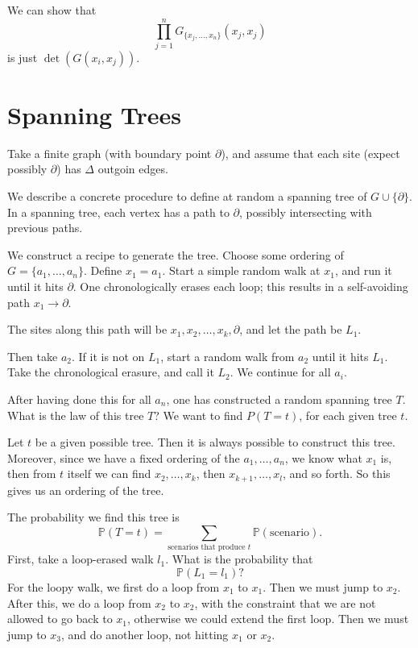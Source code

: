 \documentclass[12pt]{article}
\begin{document}
\begin{remark}
	We can show that
	\[
		\prod_{j = 1}^{n} G_{\{x_j, \ldots, x_n\}}(x_j, x_j)
	\]
	is just $\det (G(x_i, x_j))$.
\end{remark}


\newpage

\section{Spanning Trees}%
\label{sec:st}

Take a finite graph (with boundary point $\partial$), and assume that each site (expect possibly $\partial$) has $\Delta$ outgoin edges.

We describe a concrete procedure to define at random a spanning tree of $G \cup \{\partial\}$. In a spanning tree, each vertex has a path to $\partial$, possibly intersecting with previous paths.

We construct a recipe to generate the tree. Choose some ordering of $G = \{a_1, \ldots, a_n\}$. Define $x_1 = a_1$. Start a simple random walk at $x_1$, and run it until it hits $\partial$. One chronologically erases each loop; this results in a self-avoiding path $x_1 \to \partial$.

The sites along this path will be $x_1, x_2, \ldots, x_k, \partial$, and let the path be $L_1$.

Then take $a_2$. If it is not on $L_1$, start a random walk from $a_2$ until it hits $L_1$. Take the chronological erasure, and call it $L_2$. We continue for all $a_i$.

After having done this for all $a_n$, one has constructed a random spanning tree $T$. What is the law of this tree $T$? We want to find $P(T = t)$, for each given tree $t$.

Let $t$ be a given possible tree. Then it is always possible to construct this tree. Moreover, since we have a fixed ordering of the $a_1, \ldots, a_n$, we know what $x_1$ is, then from $t$ itself we can find $x_2, \ldots, x_k$, then $x_{k+1}, \ldots, x_l$, and so forth. So this gives us an ordering of the tree.

The probability we find this tree is
\[
	\mathbb{P}(T = t) = \sum_{\text{scenarios that produce } t} \mathbb{P}(\text{scenario}).
\]
First, take a loop-erased walk $l_1$. What is the probability that
\[
\mathbb{P}(L_1 = l_1)?
\]
For the loopy walk, we first do a loop from $x_1$ to $x_1$. Then we must jump to $x_2$. After this, we do a loop from $x_2$ to $x_2$, with the constraint that we are not allowed to go back to $x_1$, otherwise we could extend the first loop. Then we must jump to $x_3$, and do another loop, not hitting $x_1$ or $x_2$.
\end{document}
